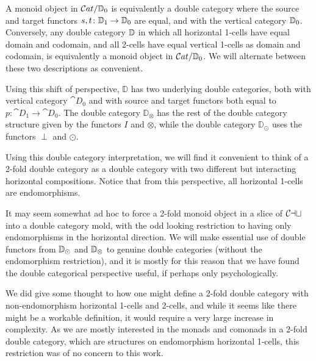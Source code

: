 A monoid object in $\mathcal{C}at/\mathbb{D}_0$ is equivalently a double category where the source and target functors $s,t\colon \mathbb{D}_1\to \mathbb{D}_0$ are equal, and with the vertical category $\mathbb{D}_0$. Conversely, any double category $\mathbb{D}$ in which all horizontal 1-cells have equal domain and codomain, and all 2-cells have equal vertical 1-cells as domain and codomain, is equivalently a monoid object in $\mathcal{C}at/\mathbb{D}_0$. We will alternate between these two descriptions as convenient.

Using this shift of perspective, $\mathbb{D}$ has two underlying double categories, both with vertical category $\cat{D}_0$ and with source and target functors both equal to $p\colon\cat{D}_1\to\cat{D}_0$. The double category $\mathbb{D}_{\otimes}$ has the rest of the double category structure given by the functors $I$ and $\otimes$, while the double category $\mathbb{D}_{\odot}$ uses the functors $\perp$ and $\odot$.

Using this double category interpretation, we will find it convenient to think of a 2-fold double category as a double category with two different but interacting horizontal compositions. Notice that from this perspective, all horizontal 1-cells are endomorphisms.

\begin{remark}
	It may seem somewhat ad hoc to force a 2-fold monoid object in a slice of $\mathcal{Cat}$ into a double category mold, with the odd looking restriction to having only endomorphisms in the horizontal direction. We will make essential use of double functors from $\mathbb{D}_{\odot}$ and $\mathbb{D}_{\otimes}$ to genuine double categories (without the endomorphism restriction), and it is mostly for this reason that we have found the double categorical perspective useful, if perhaps only psychologically.

	We did give some thought to how one might define a 2-fold double category with non-endomorphism horizontal 1-cells and 2-cells, and while it seems like there might be a workable definition, it would require a very large increase in complexity. As we are mostly interested in the monads and comonads in a 2-fold double category, which are structures on endomorphism horizontal 1-cells, this restriction was of no concern to this work.
\end{remark}

